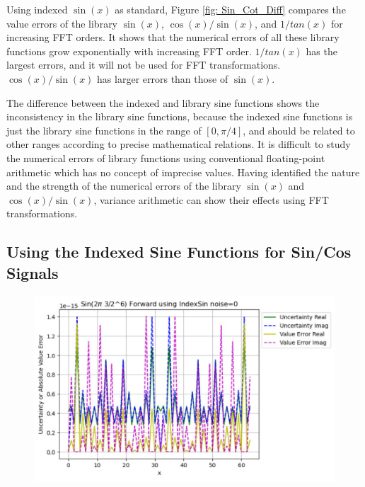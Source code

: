 \documentclass[twoside]{article}
\numberwithin{equation}{section}
\begin{document}
Using indexed $\sin(x)$ as standard, Figure \ref{fig: Sin_Cot_Diff} compares the value errors of the library $\sin(x)$, $\cos(x)/\sin(x)$, and $1/tan(x)$ for increasing FFT orders.
It shows that the numerical errors of all these library functions grow exponentially with  increasing FFT order.
$1/tan(x)$ has the largest errors, and it will not be used for FFT transformations.
$\cos(x)/\sin(x)$ has larger errors than those of $\sin(x)$.

The difference between the indexed and library sine functions shows the inconsistency in the library sine functions, because the indexed sine functions is just the library sine functions in the range of $[0, \pi/4]$, and should be related to other ranges according to precise mathematical relations.
It is difficult to study the numerical errors of library functions using conventional floating-point arithmetic which has no concept of imprecise values.
Having identified the nature and the strength of the numerical errors of the library $\sin(x)$ and $\cos(x)/\sin(x)$, variance arithmetic can show their effects using FFT transformations.



\subsection{Using the Indexed Sine Functions for Sin/Cos Signals}

\begin{figure}[p]
\includegraphics[height=2.75in]{FFT_Sin_Clean_6_3_Spec_Indexed.pdf} 
\label{fig: FFT_Sin_Clean_6_3_Spec_Indexed}
\end{figure}
\end{document}
